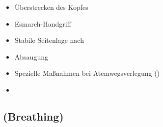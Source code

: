 
{%
\begin{itemize}
  \item Überstrecken des Kopfes
  \item Esmarch-Handgriff
  \item Stabile Seitenlage nach 
  \item Absaugung
  \item Spezielle Maßnahmen bei Atemwegsverlegung ()
  \item \TxMassVit 
\end{itemize}
}

\clearpage
\subsection{{}  (Breathing)}

\label{topic:atmung-apam}
\label{topic:breathing-apam}

